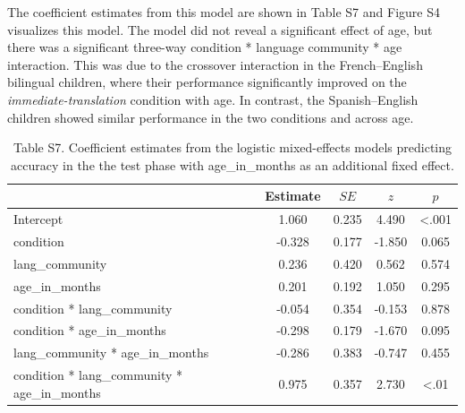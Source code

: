 \documentclass[
  man,floatsintext]{apa7}
\begin{document}
\noindent The coefficient estimates from this model are shown in Table S7 and Figure S4 visualizes this model. The model did not reveal a significant effect of age, but there was a significant three-way condition * language community * age interaction. This was due to the crossover interaction in the French--English bilingual children, where their performance significantly improved on the \emph{immediate-translation} condition with age. In contrast, the Spanish--English children showed similar performance in the two conditions and across age.

\begin{table}[H]

\begin{center}
\begin{threeparttable}

\caption{\label{tab:unnamed-chunk-21}Table S7. Coefficient estimates from the logistic mixed-effects models predicting accuracy in the the test phase with age\_in\_months as an additional fixed effect.}

\begin{tabular}{lcccc}
\toprule
 & Estimate & $SE$ & $z$ & $p$\\
\midrule
Intercept & 1.060 & 0.235 & 4.490 & <.001\\
condition & -0.328 & 0.177 & -1.850 & 0.065\\
lang\_community & 0.236 & 0.420 & 0.562 & 0.574\\
age\_in\_months & 0.201 & 0.192 & 1.050 & 0.295\\
condition * lang\_community & -0.054 & 0.354 & -0.153 & 0.878\\
condition * age\_in\_months & -0.298 & 0.179 & -1.670 & 0.095\\
lang\_community * age\_in\_months & -0.286 & 0.383 & -0.747 & 0.455\\
condition * lang\_community * age\_in\_months & 0.975 & 0.357 & 2.730 & <.01\\
\bottomrule
\end{tabular}

\end{threeparttable}
\end{center}

\end{table}
\end{document}
